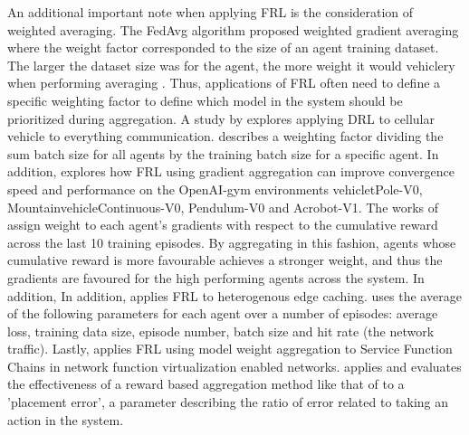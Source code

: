 An additional important note when applying FRL is the consideration of weighted averaging.
The FedAvg \cite{BrendanMcMahan2017a} algorithm proposed weighted gradient averaging where the weight factor corresponded to the size of an agent training dataset.  The larger the dataset size was for the agent, the more weight it would vehiclery when performing averaging \cite{BrendanMcMahan2017a}.  Thus, applications of FRL often need to define a specific weighting factor to define which model in the system should be prioritized during aggregation.  A study by \cite{ZhangX2020} explores applying DRL to cellular vehicle to everything communication. \cite{ZhangX2020} describes a weighting factor dividing the sum batch size for all agents  by the training batch size for a specific agent.  In addition, \cite{LimHyun2021} explores how FRL using gradient aggregation can improve convergence speed and performance on the OpenAI-gym environments vehicletPole-V0, MountainvehicleContinuous-V0, Pendulum-V0 and Acrobot-V1. The works of \cite{LimHyun2021} assign weight to each agent's gradients with respect to the cumulative reward across the last 10 training episodes. By aggregating in this fashion, agents whose cumulative reward is more favourable achieves a stronger weight, and thus the gradients are favoured for the high performing agents across the system.  In addition, In addition, \cite{WangXiaofei2021} applies FRL to heterogenous edge caching.  \cite{WangXiaofei2021} uses the average of the following parameters for each agent over a number of episodes: average loss, training data size, episode number, batch size and hit rate (the network traffic). Lastly, \cite{Huang2021} applies FRL using model weight aggregation to Service Function Chains in network function virtualization enabled networks.  \cite{Huang2021} applies and evaluates the effectiveness of a reward based aggregation method like that of \cite{WangXiaofei2021} to a 'placement error', a parameter describing the ratio of error related to taking an action in the system.
